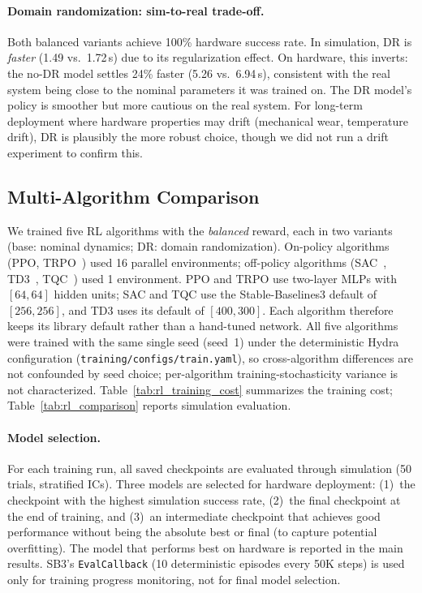 \paragraph{Domain randomization: sim-to-real trade-off.}
Both balanced variants achieve 100\% hardware success rate.
In simulation, DR is \emph{faster} (1.49 vs.\ 1.72\,s) due to
its regularization effect.
On hardware, this inverts: the no-DR model settles 24\% faster
(5.26 vs.\ 6.94\,s), consistent with the real system being close to the
nominal parameters it was trained on.
The DR model's policy is smoother but more cautious on the
real system.
For long-term deployment where hardware properties may drift
(mechanical wear, temperature drift), DR is plausibly the more robust
choice, though we did not run a drift experiment to confirm this.

\subsection{Multi-Algorithm Comparison}
\label{appendix:multi_algo}

We trained five RL algorithms with the \emph{balanced} reward, each
in two variants (base: nominal dynamics; DR: domain randomization).
On-policy algorithms (PPO, TRPO~\cite{schulman2015trpo}) used 16 parallel
environments; off-policy algorithms (SAC~\cite{haarnoja2018sac},
TD3~\cite{fujimoto2018td3}, TQC~\cite{kuznetsov2020controlling})
used 1 environment.
PPO and TRPO use two-layer MLPs with $[64,64]$ hidden units; SAC and TQC use
the Stable-Baselines3 default of $[256,256]$, and TD3 uses its default of
$[400,300]$. Each algorithm therefore keeps its library
default rather than a hand-tuned network. All five algorithms were trained
with the same single seed (seed~1) under the deterministic Hydra
configuration (\texttt{training/configs/train.yaml}), so cross-algorithm
differences are not confounded by seed choice; per-algorithm
training-stochasticity variance is not characterized.
Table~\ref{tab:rl_training_cost} summarizes the training cost;
Table~\ref{tab:rl_comparison} reports simulation evaluation.

\paragraph{Model selection.}
For each training run, all saved checkpoints are evaluated through
simulation (50 trials, stratified ICs). Three models are selected
for hardware deployment: (1)~the checkpoint with the highest
simulation success rate, (2)~the final checkpoint at the end of
training, and (3)~an intermediate checkpoint that achieves good
performance without being the absolute best or final (to capture
potential overfitting). The model that performs best on hardware
is reported in the main results. SB3's \texttt{EvalCallback}
(10 deterministic episodes every 50K steps) is used only for
training progress monitoring, not for final model selection.

